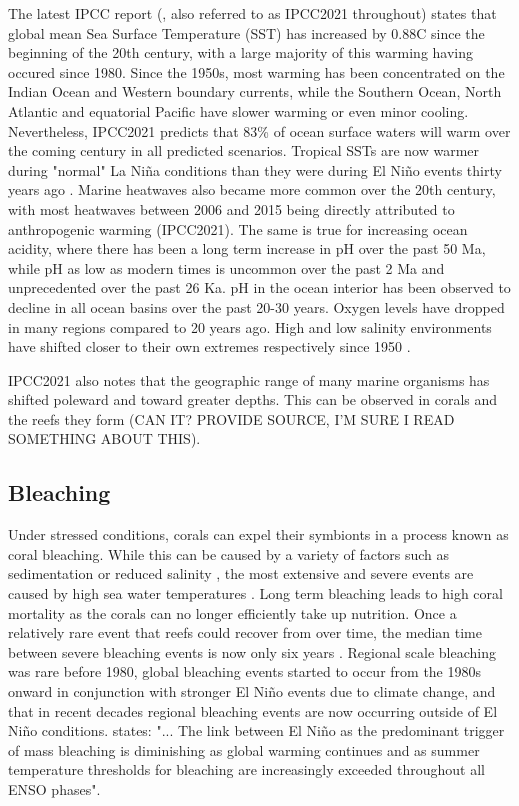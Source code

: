 \documentclass[11pt,a4paper]{article}
\begin{document}
The latest IPCC report (\cite{IPCC2021WG1}, also referred to as IPCC2021 throughout) states that global mean Sea Surface Temperature (SST) has increased by 0.88\textdegree C since the beginning of the 20th century, with a large majority of this warming having occured since 1980. Since the 1950s, most warming has been concentrated on the Indian Ocean and Western boundary currents, while the Southern Ocean, North Atlantic and equatorial Pacific have slower warming or even minor cooling. Nevertheless, IPCC2021 predicts that 83\% of ocean surface waters will warm over the coming century in all predicted scenarios. Tropical SSTs are now warmer during "normal" La Ni\~{n}a conditions than they were during El Ni\~{n}o events thirty years ago \citep{Hughes2018a}. 
Marine heatwaves also became more common over the 20th century, with most heatwaves between 2006 and 2015 being directly attributed to anthropogenic warming (IPCC2021). 
The same is true for increasing ocean acidity, where there has been a long term increase in pH over the past 50 Ma, while pH as low as modern times is uncommon over the past 2 Ma and unprecedented over the past 26 Ka. pH in the ocean interior has been observed to decline in all ocean basins over the past 20-30 years. 
Oxygen levels have dropped in many regions compared to 20 years ago. High and low salinity environments have shifted closer to their own extremes respectively since 1950 \citep{IPCC2013TS}.

IPCC2021 also notes that the geographic range of many marine organisms has shifted poleward and toward greater depths. This can be observed in corals and the reefs they form (CAN IT? PROVIDE SOURCE, I'M SURE I READ SOMETHING ABOUT THIS).

\subsection{Bleaching}
\label{Present Bleaching}
Under stressed conditions, corals can expel their symbionts in a process known as coral bleaching. While this can be caused by a variety of factors such as sedimentation or reduced salinity \citep{Van1995}, the most extensive and severe events are caused by high sea water temperatures \citep{Baird2018}.  Long term bleaching leads to high coral mortality as the corals can no longer efficiently take up nutrition. 
Once a relatively rare event that reefs could recover from over time, the median time between severe bleaching events is now only six years \citep{Hughes2018a}. Regional scale bleaching was rare before 1980, global bleaching events started to occur from the 1980s onward in conjunction with stronger El Ni\~{n}o events due to climate change, and that in recent decades regional bleaching events are now occurring outside of El Ni\~{n}o conditions. \cite{Hughes2018a} states: "... The link between El Ni\~{n}o as the predominant trigger of mass bleaching is diminishing as global warming continues and as summer temperature thresholds for bleaching are increasingly exceeded throughout all ENSO phases".
\end{document}
